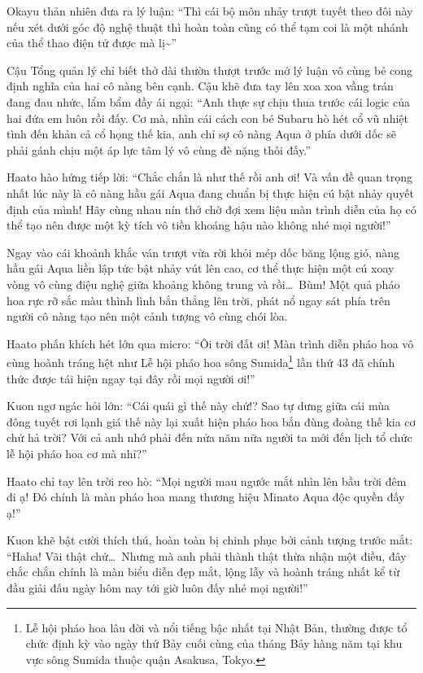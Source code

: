 \documentclass[../main.tex]{subfiles}
\begin{document}
Okayu thản nhiên đưa ra lý luận: ``Thì cái bộ môn nhảy trượt tuyết theo đôi này nếu xét dưới góc độ nghệ thuật thì hoàn toàn cũng có thể tạm coi là một nhánh của thể thao điện tử được mà lị\~{}''

Cậu Tổng quản lý chỉ biết thở dài thườn thượt trước mớ lý luận vô cùng bẻ cong định nghĩa của hai cô nàng bên cạnh. Cậu khẽ đưa tay lên xoa xoa vầng trán đang đau nhức, lẩm bẩm đầy ái ngại: ``Anh thực sự chịu thua trước cái logic của hai đứa em luôn rồi đấy. Cơ mà, nhìn cái cách con bé Subaru hò hét cổ vũ nhiệt tình đến khản cả cổ họng thế kia, anh chỉ sợ cô nàng Aqua ở phía dưới dốc sẽ phải gánh chịu một áp lực tâm lý vô cùng đè nặng thôi đấy.''

Haato hào hứng tiếp lời: ``Chắc chắn là như thế rồi anh ơi! Và vấn đề quan trọng nhất lúc này là cô nàng hầu gái Aqua đang chuẩn bị thực hiện cú bật nhảy quyết định của mình! Hãy cùng nhau nín thở chờ đợi xem liệu màn trình diễn của họ có thể tạo nên được một kỳ tích vô tiền khoáng hậu nào không nhé mọi người!''

Ngay vào cái khoảnh khắc ván trượt vừa rời khỏi mép dốc băng lộng gió, nàng hầu gái Aqua liền lập tức bật nhảy vút lên cao, cơ thể thực hiện một cú xoay vòng vô cùng điệu nghệ giữa khoảng không trung và rồi\dots\ Bùm! Một quả pháo hoa rực rỡ sắc màu thình lình bắn thẳng lên trời, phát nổ ngay sát phía trên người cô nàng tạo nên một cảnh tượng vô cùng chói lòa.

Haato phấn khích hét lớn qua micro: ``Ôi trời đất ơi! Màn trình diễn pháo hoa vô cùng hoành tráng hệt như Lễ hội pháo hoa sông Sumida\footnote{Lễ hội pháo hoa lâu đời và nổi tiếng bậc nhất tại Nhật Bản, thường được tổ chức định kỳ vào ngày thứ Bảy cuối cùng của tháng Bảy hàng năm tại khu vực sông Sumida thuộc quận Asakusa, Tokyo.} lần thứ 43 đã chính thức được tái hiện ngay tại đây rồi mọi người ơi!''

Kuon ngơ ngác hỏi lớn: ``Cái quái gì thế này chứ!? Sao tự dưng giữa cái mùa đông tuyết rơi lạnh giá thế này lại xuất hiện pháo hoa bắn đùng đoàng thế kia cơ chứ hả trời? Với cả anh nhớ phải đến nửa năm nữa người ta mới đến lịch tổ chức lễ hội pháo hoa cơ mà nhỉ?''

Haato chỉ tay lên trời reo hò: ``Mọi người mau ngước mắt nhìn lên bầu trời đêm đi ạ! Đó chính là màn pháo hoa mang thương hiệu Minato Aqua độc quyền đấy ạ!''

Kuon khẽ bật cười thích thú, hoàn toàn bị chinh phục bởi cảnh tượng trước mắt: ``Haha! Vãi thật chứ\dots\ Nhưng mà anh phải thành thật thừa nhận một điều, đây chắc chắn chính là màn biểu diễn đẹp mắt, lộng lẫy và hoành tráng nhất kể từ đầu giải đấu ngày hôm nay tới giờ luôn đấy nhé mọi người!''
\end{document}
